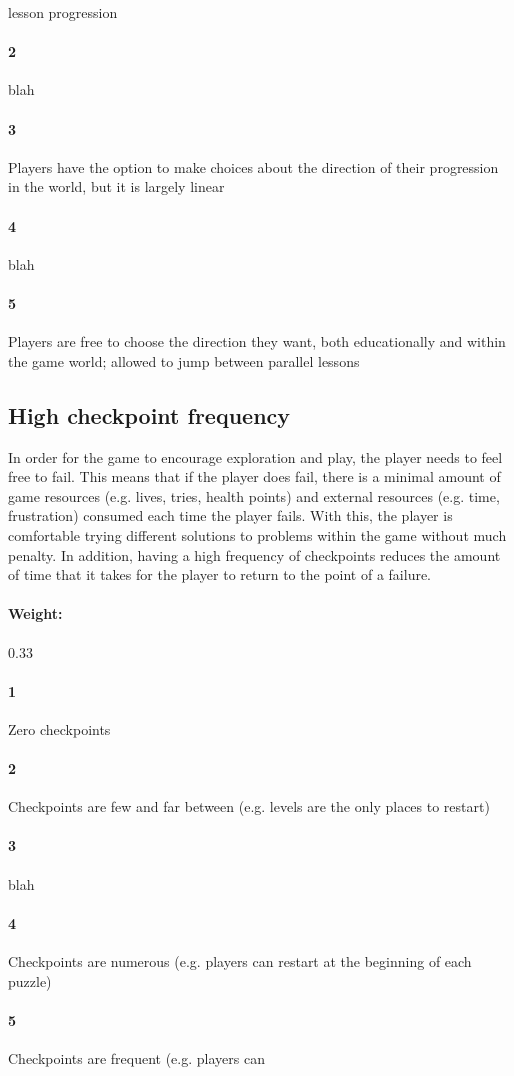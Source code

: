 lesson progression\paragraph{2}blah\paragraph{3}Players have the option to make choices about the direction of their progression in the world, but it is largely linear\paragraph{4}blah\paragraph{5}Players are free to choose the direction they want, both educationally and within the game world; allowed to jump between parallel lessons\subsection{High checkpoint frequency}{In order for the game to encourage exploration and play, the player needs to feel free to fail. This means that if the player does fail, there is a minimal amount of game resources (e.g. lives, tries, health points) and external resources (e.g. time, frustration) consumed each time the player fails. With this, the player is comfortable trying different solutions to problems within the game without much penalty. In addition, having a high frequency of checkpoints reduces the amount of time that it takes for the player to return to the point of a failure.} \paragraph{Weight:}{0.33}\paragraph{1}Zero checkpoints\paragraph{2}Checkpoints are few and far between (e.g. levels are the only places to restart)\paragraph{3}blah\paragraph{4}Checkpoints are numerous (e.g. players can restart at the beginning of each puzzle)\paragraph{5}Checkpoints are frequent (e.g. players can 